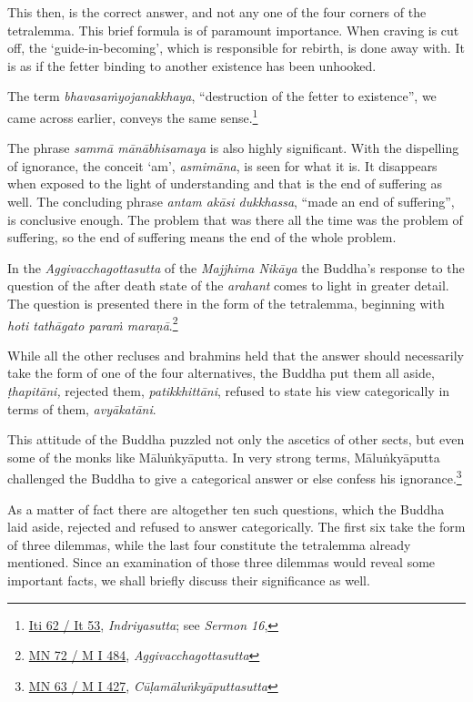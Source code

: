 This then, is the correct answer, and not any one of the four corners of the tetralemma. This brief formula is of paramount importance. When craving is cut off, the `guide-in-becoming', which is responsible for rebirth, is done away with. It is as if the fetter binding to another existence has been unhooked.

The term \emph{bhavasaṁyojanakkhaya}, ``destruction of the fetter to existence'', we came across earlier, conveys the same sense.\footnote{\href{https://suttacentral.net/iti62/pli/ms}{Iti 62 / It 53}, \emph{Indriyasutta}; see \emph{Sermon 16},}

The phrase \emph{sammā mānābhisamaya} is also highly significant. With the dispelling of ignorance, the conceit `am', \emph{asmimāna}, is seen for what it is. It disappears when exposed to the light of understanding and that is the end of suffering as well. The concluding phrase \emph{antam akāsi dukkhassa}, ``made an end of suffering'', is conclusive enough. The problem that was there all the time was the problem of suffering, so the end of suffering means the end of the whole problem.

In the \emph{Aggivacchagottasutta} of the \emph{Majjhima Nikāya} the Buddha's response to the question of the after death state of the \emph{arahant} comes to light in greater detail. The question is presented there in the form of the tetralemma, beginning with \emph{hoti tathāgato paraṁ maraṇā}.\footnote{\href{https://suttacentral.net/mn72/pli/ms}{MN 72 / M I 484}, \emph{Aggivacchagottasutta}}

While all the other recluses and brahmins held that the answer should necessarily take the form of one of the four alternatives, the Buddha put them all aside, \emph{ṭhapitāni,} rejected them, \emph{patikkhittāni}, refused to state his view categorically in terms of them, \emph{avyākatāni}.

This attitude of the Buddha puzzled not only the ascetics of other sects, but even some of the monks like Māluṅkyāputta. In very strong terms, Māluṅkyāputta challenged the Buddha to give a categorical answer or else confess his ignorance.\footnote{\href{https://suttacentral.net/mn63/pli/ms}{MN 63 / M I 427}, \emph{Cūḷamāluṅkyāputtasutta}}

As a matter of fact there are altogether ten such questions, which the Buddha laid aside, rejected and refused to answer categorically. The first six take the form of three dilemmas, while the last four constitute the tetralemma already mentioned. Since an examination of those three dilemmas would reveal some important facts, we shall briefly discuss their significance as well.

